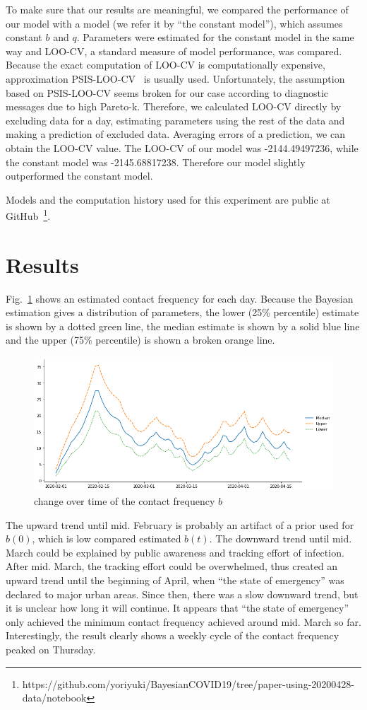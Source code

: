 \documentclass{article}
\begin{document}
To make sure that our results are meaningful, we compared the performance of our model with a model (we refer it by ``the constant model''), which assumes constant $b$ and $q$.
Parameters were estimated for the constant model in the same way and LOO-CV, a standard measure of model performance, was compared.
Because the exact computation of LOO-CV is computationally expensive, approximation PSIS-LOO-CV~\cite{Vehtari2017} is usually used.
Unfortunately, the assumption based on PSIS-LOO-CV seems broken for our case according to diagnostic messages due to high Pareto-k.
Therefore, we calculated LOO-CV directly by excluding data for a day, estimating parameters using the rest of the data and making a prediction of excluded data.
Averaging errors of a prediction, we can obtain the LOO-CV value.
The LOO-CV of our model was -2144.49497236, while the constant model was -2145.68817238. Therefore our model slightly outperformed the constant model.

Models and the computation history used for this experiment are public at GitHub~\footnote{https://github.com/yoriyuki/BayesianCOVID19/tree/paper-using-20200428-data/notebook}.

\section{Results}

Fig.~\ref{fig:b} shows an estimated contact frequency for each day.
Because the Bayesian estimation gives a distribution of parameters, the lower (25\% percentile) estimate is shown by a dotted green line, the median estimate is shown by a solid blue line and the upper (75\% percentile) is shown a broken orange line.
\begin{figure}[h]
 \centering
 \includegraphics[width=\linewidth]{fig/b-Japan.png}
 \caption{ change over time of the contact frequency $b$}
 \label{fig:b}
\end{figure}
The upward trend until mid. February is probably an artifact of a prior used for $b(0)$, which is low compared estimated $b(t)$.
The downward trend until mid. March could be explained by public awareness and tracking effort of infection.
After mid. March, the tracking effort could be overwhelmed, thus created an upward trend until the beginning of April, when ``the state of emergency'' was declared to major urban areas.
Since then, there was a slow downward trend, but it is unclear how long it will continue.
It appears that ``the state of emergency'' only achieved the minimum contact frequency achieved around mid. March so far.
Interestingly, the result clearly shows a weekly cycle of the contact frequency peaked on Thursday.
\end{document}
